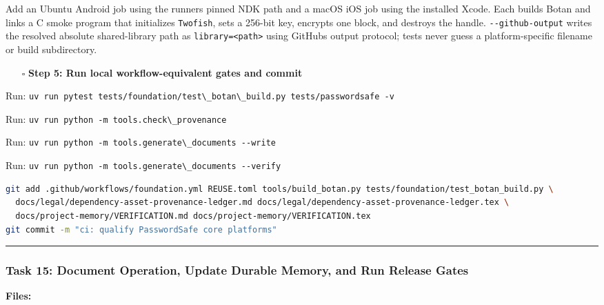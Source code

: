 \documentclass[
  letterpaper,
]{article}
\newcommand{\passthrough}[1]{#1}
\providecommand{\tightlist}{%
  \setlength{\itemsep}{0pt}\setlength{\parskip}{0pt}}
\begin{document}
Add an Ubuntu Android job using the runner\textquotesingle s pinned NDK path and a macOS iOS job using the installed
Xcode. Each builds Botan and links a C smoke program that initializes \passthrough{\lstinline!Twofish!}, sets a 256-bit
key, encrypts one block, and destroys the handle. \nolinkurl{--github-output} writes the resolved absolute
shared-library path as \nolinkurl{library=<path>} using GitHub\textquotesingle s output protocol; tests never guess a
platform-specific filename or build subdirectory.

\begin{itemize}
\tightlist
\item[$\square$]
  \textbf{Step 5: Run local workflow-equivalent gates and commit}
\end{itemize}

Run: \passthrough{\lstinline!uv run pytest tests/foundation/test\_botan\_build.py tests/passwordsafe -v!}

Run: \passthrough{\lstinline!uv run python -m tools.check\_provenance!}

Run: \passthrough{\lstinline!uv run python -m tools.generate\_documents --write!}

Run: \passthrough{\lstinline!uv run python -m tools.generate\_documents --verify!}

\begin{lstlisting}[language=bash]
git add .github/workflows/foundation.yml REUSE.toml tools/build_botan.py tests/foundation/test_botan_build.py \
  docs/legal/dependency-asset-provenance-ledger.md docs/legal/dependency-asset-provenance-ledger.tex \
  docs/project-memory/VERIFICATION.md docs/project-memory/VERIFICATION.tex
git commit -m "ci: qualify PasswordSafe core platforms"
\end{lstlisting}

\begin{center}\rule{0.5\linewidth}{0.5pt}\end{center}

\subsubsection{Task 15: Document Operation, Update Durable Memory, and Run Release
Gates}\label{task-15-document-operation-update-durable-memory-and-run-release-gates}

\textbf{Files:}
\end{document}
